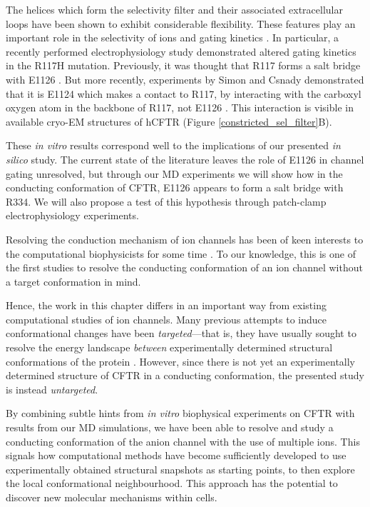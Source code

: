 The helices which form the selectivity filter and their associated extracellular loops have been shown to exhibit considerable flexibility. These features play an important role in the selectivity of ions and gating kinetics \cite{linsdell1998, kim2019, negoda2018, negoda2019}. In particular, a recently performed electrophysiology study demonstrated altered gating kinetics in the R117H mutation. Previously, it was thought that R117 forms a salt bridge with E1126 \cite{cui2014}. But more recently, experiments by Simon and Csnady demonstrated that it is E1124 which makes a contact to R117, by interacting with the carboxyl oxygen atom in the backbone of R117, not E1126 \cite{simon2021}. This interaction is visible in available cryo-EM structures of hCFTR (Figure \ref{constricted_sel_filter}B). 

These \textit{in vitro} results correspond well to the implications of our presented \textit{in silico} study. The current state of the literature leaves the role of E1126 in channel gating unresolved, but through our MD experiments we will show how in the conducting conformation of CFTR, E1126 appears to form a salt bridge with R334. We will also propose a test of this hypothesis through patch-clamp electrophysiology experiments. 

Resolving the conduction mechanism of ion channels has been of keen interests to the computational biophysicists for some time \cite{black2020, flood2019}. To our knowledge, this is one of the first studies to resolve the conducting conformation of an ion channel without a target conformation in mind. 

Hence, the work in this chapter differs in an important way from existing computational studies of ion channels. Many previous attempts to induce conformational changes have been \textit{targeted}---that is, they have usually sought to resolve the energy landscape \textit{between} experimentally determined structural conformations of the protein \cite{hoffmann2018, lev2020, bergh2021, mccomas2022}. However, since there is not yet an experimentally determined structure of CFTR in a conducting conformation, the presented study is instead \textit{untargeted}. 

By combining subtle hints from \textit{in vitro} biophysical experiments on CFTR with results from our MD simulations, we have been able to resolve and study a conducting conformation of the anion channel with the use of multiple ions. This signals how computational methods have become sufficiently developed to use experimentally obtained structural snapshots as starting points, to then explore the local conformational neighbourhood. This approach has the potential to discover new molecular mechanisms within cells.

